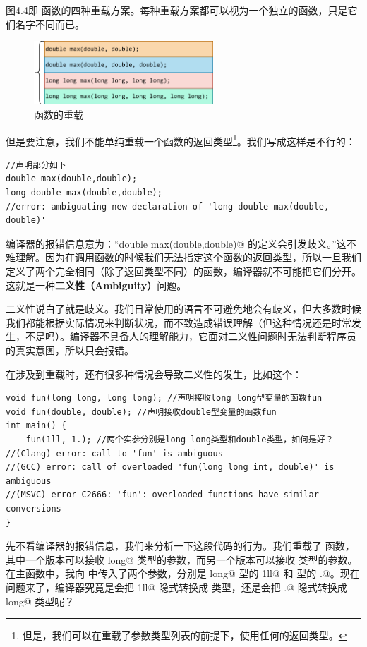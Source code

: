 图4.4即 \lstinline@max@ 函数的四种重载方案。每种重载方案都可以视为一个独立的函数，只是它们名字不同而已。\par
\begin{figure}[htbp]
    \centering
    \includegraphics[width=0.6\textwidth]{../images/generalized_parts/04_function_overloading.drawio.png}
    \caption{\lstinline@max@ 函数的重载}
\end{figure}\pagebreak
但是要注意，我们不能单纯重载一个函数的返回类型\footnote{但是，我们可以在重载了参数类型列表的前提下，使用任何的返回类型。}。我们写成这样是不行的：
\begin{lstlisting}
//声明部分如下
double max(double,double);
long double max(double,double);
//error: ambiguating new declaration of 'long double max(double, double)'
\end{lstlisting}
编译器的报错信息意为：``\lstinline@long double max(double,double)@ 的定义会引发歧义。''这不难理解。因为在调用函数的时候我们无法指定这个函数的返回类型，所以一旦我们定义了两个完全相同（除了返回类型不同）的函数，编译器就不可能把它们分开。这就是一种\textbf{二义性（Ambiguity）}问题。\par
二义性说白了就是歧义。我们日常使用的语言不可避免地会有歧义，但大多数时候我们都能根据实际情况来判断状况，而不致造成错误理解（但这种情况还是时常发生，不是吗）。编译器不具备人的理解能力，它面对二义性问题时无法判断程序员的真实意图，所以只会报错。\par
在涉及到重载时，还有很多种情况会导致二义性的发生，比如这个：
\begin{lstlisting}
void fun(long long, long long); //声明接收long long型变量的函数fun
void fun(double, double); //声明接收double型变量的函数fun
int main() {
    fun(1ll, 1.); //两个实参分别是long long类型和double类型，如何是好？
//(Clang) error: call to 'fun' is ambiguous
//(GCC) error: call of overloaded 'fun(long long int, double)' is ambiguous
//(MSVC) error C2666: 'fun': overloaded functions have similar conversions
}
\end{lstlisting}
先不看编译器的报错信息，我们来分析一下这段代码的行为。我们重载了 \lstinline@fun@ 函数，其中一个版本可以接收 \lstinline@long long@ 类型的参数，而另一个版本可以接收 \lstinline@double@ 类型的参数。在主函数中，我向 \lstinline@fun@ 中传入了两个参数，分别是 \lstinline@long long@ 型的 \lstinline@1ll@ 和 \lstinline@double@ 型的 .@。现在问题来了，编译器究竟是会把 \lstinline@1ll@ 隐式转换成 \lstinline@double@ 类型，还是会把 .@ 隐式转换成 \lstinline@long long@ 类型呢？\par
